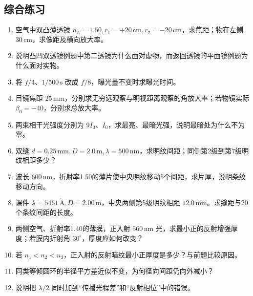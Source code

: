 \documentclass[UTF8,fontset=none,zihao=-4,a4paper]{ctexart}
\newcommand{\unit}[1]{\,\mathrm{#1}}
\begin{document}
\subsection{综合练习}
\begin{enumerate}
\item 空气中双凸薄透镜 $n_L=1.50,r_1=+20\unit{cm},r_2=-20\unit{cm}$，求焦距；物在左侧 $30\unit{cm}$，求像距及横向放大率。
\item 说明凸凹双透镜例题中第二透镜为什么面对虚物，而返回透镜的平面镜例题为什么面对实物。
\item 将 $f/4$、$1/500\unit s$ 改成 $f/8$，曝光量不变时求曝光时间。
\item 目镜焦距 $25\unit{mm}$，分别求无穷远观察与明视距离观察的角放大率；若物镜实际 $\beta_0=-40$，分别求总放大率。
\item 两束相干光强度分别为 $9I_0$、$I_0$，求最亮、最暗光强，说明最暗处为什么不为零。
\item 双缝 $d=0.25\unit{mm},D=2.0\unit m,\lambda=500\unit{nm}$，求明纹间距；同侧第2级到第7级明纹相距多少？
\item 波长 $600\unit{nm}$，折射率1.50的薄片使中央明纹移动5个间距，求片厚，说明条纹移动方向。
\item 课件 $\lambda=5461\unit{\mathring A},D=2.00\unit m$，中央两侧第5级明纹相距 $12.0\unit{mm}$。求缝距与20个条纹间距的长度。
\item 两侧空气、折射率1.40的薄膜，正入射 $560\unit{nm}$ 光，求最小正的反射增强厚度；若膜内折射角 $30^\circ$，厚度应如何改变？
\item 若 $n_1<n_2<n_3$，正入射的反射暗纹最小正厚度是多少？与前题比较原因。
\item 同类等倾圆环的半径平方差近似不变，为何径向间距仍向外减小？
\item 说明把 $\lambda/2$ 同时加到“传播光程差”和“反射相位”中的错误。
\end{enumerate}
\end{document}
